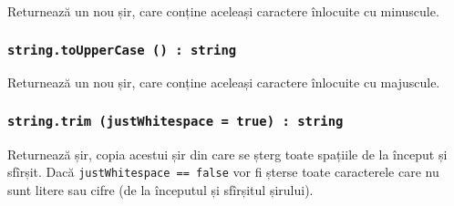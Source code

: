 Returnează un nou șir, care conține aceleași caractere înlocuite cu minuscule.

\subsubsection{\texttt{string.toUpperCase () : string}}

Returnează un nou șir, care conține aceleași caractere înlocuite cu majuscule.

\subsubsection{\texttt{string.trim (justWhitespace = true) : string}}

Returnează șir, copia acestui șir din care se șterg toate spațiile de la început și sfîrșit. Dacă \texttt{justWhitespace == false} vor fi șterse toate caracterele care nu sunt litere sau cifre (de la începutul și sfîrșitul șirului).



